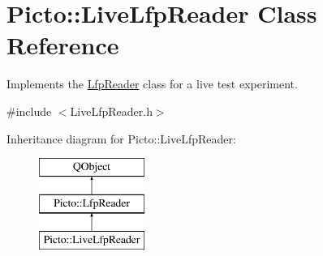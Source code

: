 \hypertarget{class_picto_1_1_live_lfp_reader}{\section{Picto\-:\-:Live\-Lfp\-Reader Class Reference}
\label{class_picto_1_1_live_lfp_reader}
}


Implements the \hyperlink{class_picto_1_1_lfp_reader}{Lfp\-Reader} class for a live test experiment.  




{\ttfamily \#include $<$Live\-Lfp\-Reader.\-h$>$}

Inheritance diagram for Picto\-:\-:Live\-Lfp\-Reader\-:\begin{figure}[H]
\begin{center}
\leavevmode
\includegraphics[height=3.000000cm]{class_picto_1_1_live_lfp_reader}
\end{center}
\end{figure}
